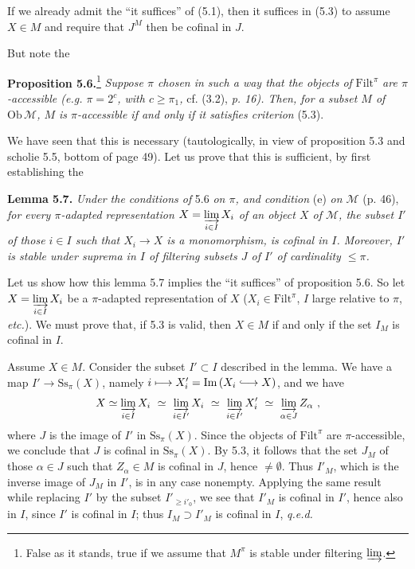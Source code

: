 \documentclass[11pt]{article}
\newcommand{\printedpage}[1]{\marginpar{\footnotesize p.~#1}}
\newcommand{\msp}[1]{\marginpar{\footnotesize [#1]}}
\newcommand{\cM}{\mathcal{M}}
\newcommand{\Filt}{\mathrm{Filt}}
\newcommand{\Ss}{\mathrm{Ss}}
\newcommand{\Ob}{\mathrm{Ob}\,}
\newcommand{\Img}{\mathrm{Im}\,}
\newcommand{\hookto}{\lhook\joinrel\longrightarrow}
\begin{document}
If we already admit the ``it suffices'' of (5.1), then it suffices in (5.3) to assume $X \in M$ and require that $J^{M}$ then be cofinal in $J$.

But note the
\msp{page 52}

\textbf{Proposition 5.6.}\footnote[21]{False as it stands, true if we assume that $M^{\pi}$ is stable under filtering $\varinjlim$.} \textit{Suppose $\pi$ chosen in such a way that the objects of} $\Filt^{\pi}$ \textit{are $\pi$-accessible (e.g. $\pi = 2^{c}$, with $c \geq \pi_1$,} cf. (3.2), \textit{p. 16). Then, for a subset $M$ of} $\Ob\cM$\textit{, $M$ is $\pi$-accessible if and only if it satisfies criterion} (5.3).

We have seen that this is necessary (tautologically, in view of proposition 5.3 and scholie 5.5, bottom of page 49). Let us prove that this is sufficient, by first establishing the

\textbf{Lemma 5.7.} \textit{Under the conditions of} 5.6 \textit{on $\pi$, and condition} (e) \textit{on $\cM$} (p. 46), \textit{for every $\pi$-adapted representation $X = \varinjlim\limits_{i\in I} X_i$ of an object $X$ of $\cM$, the subset $I'$ of those $i \in I$ such that $X_i \longrightarrow X$ is a monomorphism, is cofinal in $I$. Moreover, $I'$ is stable under suprema in $I$ of filtering subsets $J$ of $I'$ of cardinality $\leq \pi$.}

Let us show how this lemma 5.7 implies the ``it suffices'' of proposition 5.6. So let $X = \varinjlim\limits_{i\in I} X_i$ be a $\pi$-adapted representation of $X$ ($X_i \in \Filt^{\pi}$, $I$ large relative to $\pi$, \textit{etc.}). We must prove that, if 5.3 is valid, then $X \in M$ if and only if the set $I_M$ is cofinal in $I$.

\msp{page 53}
Assume $X \in M$. Consider the subset $I' \subset I$ described in the lemma. We have a map $I' \longrightarrow \Ss_{\pi}(X)$, namely $i \longmapsto X'_i = \Img (X_i \hookto X)$, and we have
\[
X \simeq \varinjlim_{i\in I} X_i \ \simeq \ \varinjlim_{i\in I'} X_i \ \simeq \ \varinjlim_{i\in I'} X'_i \ \simeq \ \varinjlim_{\alpha\in J} Z_{\alpha} \ ,
\]
where $J$ is the image of $I'$ in $\Ss_{\pi}(X)$. Since the objects of $\Filt^{\pi}$ are $\pi$-accessible, we conclude that $J$ is cofinal in $\Ss_{\pi}(X)$. By 5.3, it follows that the set $J_M$ of those $\alpha \in J$
\printedpage{33}
such that $Z_{\alpha} \in M$ is cofinal in $J$, hence $\neq \emptyset$. Thus $I'_M$, which is the inverse image of $J_M$ in $I'$, is in any case nonempty. Applying the same result while replacing $I'$ by the subset $I'_{\geq i'_0}$, we see that $I'_M$ is cofinal in $I'$, hence also in $I$, since $I'$ is cofinal in $I$; thus $I_M \supset I'_M$ is cofinal in $I$, \quad \textit{q.e.d.}
\end{document}
